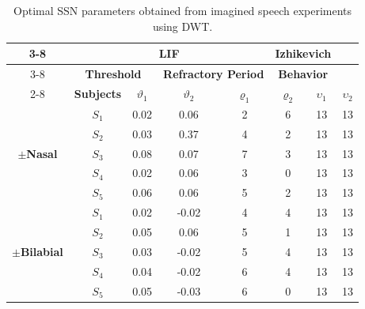 \begin{table}[h!]
	\centering
	\caption{Optimal SSN parameters obtained from imagined speech experiments using DWT.}
	\begin{tabular}{|*{8}{c|}}
		\cline{3-8}
		\multicolumn{2}{c|}{\multirow{1}{*}} & \multicolumn{4}{c|}{\textbf{LIF}} & \multicolumn{2}{c|}{\textbf{Izhikevich}} \\\cline{3-8}
		\multicolumn{2}{c|}{\multirow{1}{*}} & \multicolumn{2}{c|}{\textbf{Threshold}} & \multicolumn{2}{c|}{\textbf{Refractory Period}} & \multicolumn{2}{c|}{\textbf{Behavior}} \\\cline{2-8}
		\multicolumn{1}{c|}{\multirow{1}{*}} & \textbf{Subjects} & \multicolumn{1}{c|}{\boldmath$\vartheta_{1}$} & \multicolumn{1}{c|}{\boldmath$\vartheta_{2}$} & \multicolumn{1}{c|}{\boldmath$\varrho_{1}$} & \multicolumn{1}{c|}{\boldmath$\varrho_{2}$} & \multicolumn{1}{c|}{\boldmath$\upsilon_{1}$} & \multicolumn{1}{c|}{\boldmath$\upsilon_{2}$} \\\hline
			\multirow{5}{*}{\begin{sideways}\boldmath$\pm$\textbf{Nasal}\end{sideways}} & \boldmath$S_{1}$ & 0.02  & 0.06  & 2     & 6     & 13    & 13 \\\cline{2-8}
			& \boldmath$S_{2}$ & 0.03  & 0.37  & 4     & 2     & 13    & 13 \\\cline{2-8}
			& \boldmath$S_{3}$ & 0.08  & 0.07  & 7     & 3     & 13    & 13 \\\cline{2-8}
			& \boldmath$S_{4}$ & 0.02  & 0.06  & 3     & 0    & 13    & 13 \\\cline{2-8}
			& \boldmath$S_{5}$ & 0.06  & 0.06  & 5     & 2     & 13    & 13 \\\hline
			\multirow{5}{*}{\begin{sideways}\boldmath$\pm$\textbf{Bilabial}\end{sideways}} & \boldmath$S_{1}$ & 0.02  & -0.02 & 4     & 4     & 13    & 13 \\\cline{2-8}
			& \boldmath$S_{2}$ & 0.05  & 0.06  & 5     & 1     & 13    & 13 \\\cline{2-8}
			& \boldmath$S_{3}$ & 0.03  & -0.02 & 5     & 4     & 13    & 13 \\\cline{2-8}
			& \boldmath$S_{4}$ & 0.04  & -0.02 & 6     & 4     & 13    & 13 \\\cline{2-8}
			& \boldmath$S_{5}$ & 0.05  & -0.03 & 6     & 0     & 13    & 13 \\\hline
		\end{tabular}%
		\label{Table: SSN_Optimal_DWT}%
	\end{table}%

